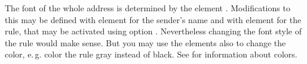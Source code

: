 \BeginIndexGroup
{}%
%
%
The font of the whole address is determined by the element
%
. Modifications to this may be defined
with element %
 for the sender's name and with element
%
 for the rule, that may be activated using
option . Nevertheless changing the font style of the rule
would make sense. But you may use the elements also to change the color,
e.\,g. color the rule gray instead of black. See \cite{package:xcolor} for
information about colors.%
%
\EndIndexGroup


